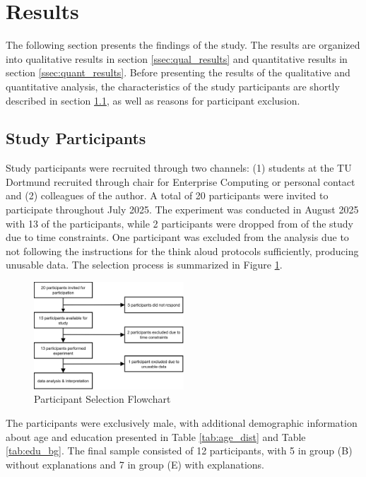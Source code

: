 \section{Results} \label{sec:results}

The following section presents the findings of the study. The results are organized into qualitative results in section \ref{ssec:qual_results} and quantitative results in section \ref{ssec:quant_results}. Before presenting the results of the qualitative and quantitative analysis, the characteristics of the study participants are shortly described in section \ref{ssec:study_participants}, as well as reasons for participant exclusion.

\subsection{Study Participants} \label{ssec:study_participants}

Study participants were recruited through two channels: (1) students at the TU Dortmund recruited through chair for Enterprise Computing or personal contact and (2) colleagues of the author. A total of 20 participants were invited to participate throughout July 2025. The experiment was conducted in August 2025 with 13 of the participants, while 2 participants were dropped from of the study due to time constraints. One participant was excluded from the analysis due to not following the instructions for the think aloud protocols sufficiently, producing unusable data. The selection process is summarized in Figure \ref{fig:participant_flow}.

\begin{figure}[ht]
    \centering
    \includegraphics[width=0.5\textwidth]{images/fig-participant_flowchart.png}
    \caption{Participant Selection Flowchart}
    \label{fig:participant_flow}
\end{figure}

The participants were exclusively male, with additional demographic information about age and education presented in Table \ref{tab:age_dist} and Table \ref{tab:edu_bg}. The final sample consisted of 12 participants, with 5 in group (B) without explanations and 7 in group (E) with explanations.

